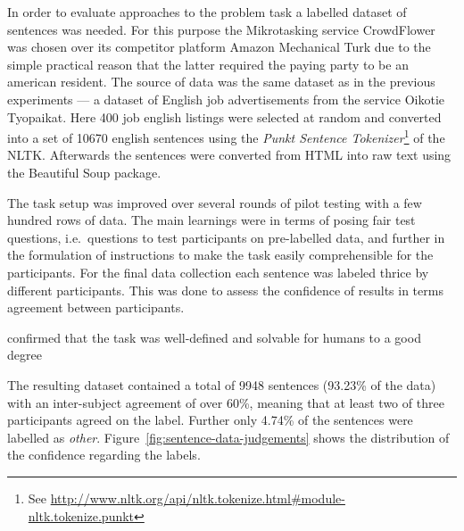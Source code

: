 In order to evaluate approaches to the problem task a labelled dataset of sentences was needed. For this purpose the \gls{Mikrotasking} service \gls{CrowdFlower} was chosen over its competitor platform \gls{Amazon Mechanical Turk} due to the simple practical reason that the latter required the paying party to be an american resident.
The source of data was the same dataset as in the previous experiments --- a dataset of English job advertisements from the service \gls{Oikotie Tyopaikat}. Here 400 job english listings were selected at random and converted into a set of 10670 english sentences using the \emph{Punkt Sentence Tokenizer}\footnote{See \url{http://www.nltk.org/api/nltk.tokenize.html\#module-nltk.tokenize.punkt}} of the \gls{NLTK}. Afterwards the sentences were converted from HTML into raw text using the \gls{Beautiful Soup} package.

The task setup was improved over several rounds of pilot testing with a few hundred rows of data. The main learnings were in terms of posing fair test questions, i.e.\ questions to test participants on pre-labelled data, and further in the formulation of instructions to make the task easily comprehensible for the participants. For the final data collection each sentence was labeled thrice by different participants. This was done to assess the confidence of results in terms agreement between participants.

confirmed that the task was well-defined and solvable for humans to a good degree

The resulting dataset contained a total of 9948 sentences (93.23\% of the data) with an inter-subject agreement of over 60\%, meaning that at least two of three participants agreed on the label. Further only 4.74\% of the sentences were labelled as \emph{other}. Figure~\ref{fig:sentence-data-judgements} shows the distribution of the confidence regarding the labels.

